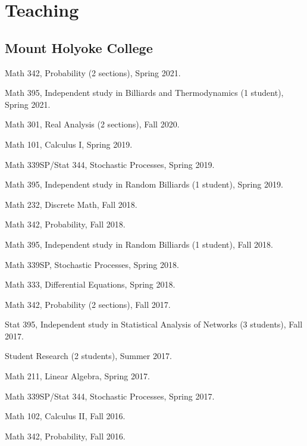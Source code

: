 \documentclass[10pt,letterpaper]{article}
\renewenvironment{itemize}{
  \begin{list}{}{
    \setlength{\leftmargin}{1.5em}
    \setlength{\itemsep}{0.25em}
    \setlength{\parskip}{0pt}
    \setlength{\parsep}{0.25em}
  }
}{
  \end{list}
}
\begin{document}
\hypertarget{teaching}{%
\section*{Teaching}\label{teaching}}

\hypertarget{mount-holyoke-college}{%
\subsection*{Mount Holyoke College}\label{mount-holyoke-college}}

\begin{itemize}
\item
  Math 342, Probability (2 sections), Spring 2021.
\item
  Math 395, Independent study in Billiards and Thermodynamics (1
  student), Spring 2021.
\item
  Math 301, Real Analysis (2 sections), Fall 2020.
\item
  Math 101, Calculus I, Spring 2019.
\item
  Math 339SP/Stat 344, Stochastic Processes, Spring 2019.
\item
  Math 395, Independent study in Random Billiards (1 student), Spring
  2019.
\item
  Math 232, Discrete Math, Fall 2018.
\item
  Math 342, Probability, Fall 2018.
\item
  Math 395, Independent study in Random Billiards (1 student), Fall
  2018.
\item
  Math 339SP, Stochastic Processes, Spring 2018.
\item
  Math 333, Differential Equations, Spring 2018.
\item
  Math 342, Probability (2 sections), Fall 2017.
\item
  Stat 395, Independent study in Statistical Analysis of Networks (3
  students), Fall 2017.
\item
  Student Research (2 students), Summer 2017.
\item
  Math 211, Linear Algebra, Spring 2017.
\item
  Math 339SP/Stat 344, Stochastic Processes, Spring 2017.
\item
  Math 102, Calculus II, Fall 2016.
\item
  Math 342, Probability, Fall 2016.
\end{itemize}
\end{document}
